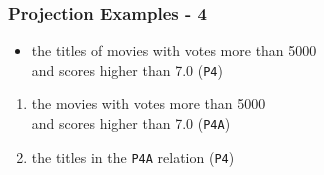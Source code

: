 \documentclass[dvipsnames]{beamer}
\theoremstyle{plain}
\begin{document}
\begin{frame}
  \frametitle{Projection Examples - 4}

  \begin{example}
    \begin{itemize}
      \item the titles of movies with votes more than 5000\\
        and scores higher than 7.0 (\texttt{P4})
    \end{itemize}

    \pause
    \begin{enumerate}
      \item the movies with votes more than 5000\\
        and scores higher than 7.0 (\texttt{P4A})

      \pause
      \item the titles in the \texttt{P4A} relation (\texttt{P4})
    \end{enumerate}
  \end{example}
\end{frame}
\end{document}
